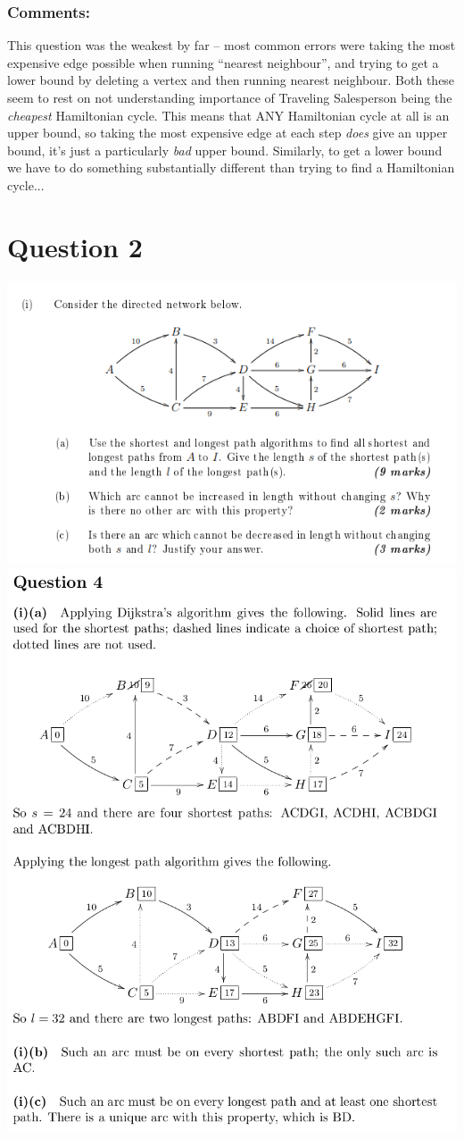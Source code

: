 \documentclass{amsart}
\begin{document}
\subsubsection*{Comments:} This question was the weakest by far -- most common errors were taking the most expensive edge possible when running ``nearest neighbour'', and trying to get a lower bound by deleting a vertex and then running nearest neighbour.  Both these seem to rest on not understanding importance of Traveling Salesperson being the \emph{cheapest} Hamiltonian cycle.  This means that ANY Hamiltonian cycle at all is an upper bound, so taking the most expensive edge at each step \emph{does} give an upper bound, it's just a particularly \emph{bad} upper bound.  Similarly, to get a lower bound we have to do something substantially different than trying to find a Hamiltonian cycle...

\section*{Question 2}
\includegraphics[width=\textwidth]{Network2014.png}
\includegraphics[width=.9\textwidth]{Network2014sol.png}
\end{document}
